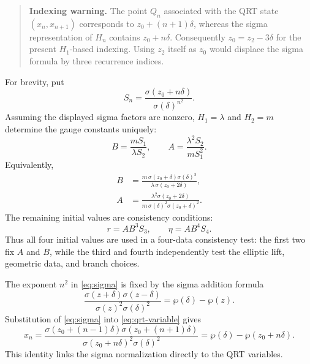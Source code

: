 \documentclass[11pt]{article}
\begin{document}
\begin{quote}
\textbf{Indexing warning.} The point $Q_n$ associated with the QRT state
$(x_n,x_{n+1})$ corresponds to $z_0+(n+1)\delta$, whereas the sigma
representation of $H_n$ contains $z_0+n\delta$. Consequently
$z_0=z_2-3\delta$ for the present $H_1$-based indexing. Using $z_2$ itself as
$z_0$ would displace the sigma formula by three recurrence indices.
\end{quote}

For brevity, put
\begin{equation}
  S_n=\frac{\sigma(z_0+n\delta)}{\sigma(\delta)^{n^2}}.
  \label{eq:Sn}
\end{equation}
Assuming the displayed sigma factors are nonzero, $H_1=\lambda$ and $H_2=m$
determine the gauge constants uniquely:
\begin{equation}
  B=\frac{mS_1}{\lambda S_2},
  \qquad
  A=\frac{\lambda^2S_2}{mS_1^2}.
  \label{eq:AB-from-S}
\end{equation}
Equivalently,
\begin{align}
  B&=\frac{m\,\sigma(z_0+\delta)\sigma(\delta)^3}
          {\lambda\,\sigma(z_0+2\delta)},
  \label{eq:B-explicit}\\
  A&=\frac{\lambda^2\sigma(z_0+2\delta)}
          {m\,\sigma(\delta)^2\sigma(z_0+\delta)^2}.
  \label{eq:A-explicit}
\end{align}
The remaining initial values are consistency conditions:
\begin{equation}
  r=A B^3S_3,
  \qquad
  \eta=A B^4S_4.
  \label{eq:sigma-initial-checks}
\end{equation}
Thus all four initial values are used in a four-data consistency test: the
first two fix $A$ and $B$, while the third and fourth independently test the
elliptic lift, geometric data, and branch choices.

The exponent $n^2$ in \cref{eq:sigma} is fixed by the sigma addition formula
\begin{equation}
  \frac{\sigma(z+\delta)\sigma(z-\delta)}
       {\sigma(z)^2\sigma(\delta)^2}
  =\wp(\delta)-\wp(z).
  \label{eq:sigma-addition}
\end{equation}
Substitution of \cref{eq:sigma} into \cref{eq:qrt-variable} gives
\begin{equation}
  x_n=
  \frac{\sigma(z_0+(n-1)\delta)\sigma(z_0+(n+1)\delta)}
       {\sigma(z_0+n\delta)^2\sigma(\delta)^2}
  =\wp(\delta)-\wp(z_0+n\delta).
  \label{eq:xn-sigma}
\end{equation}
This identity links the sigma normalization directly to the QRT variables.
\end{document}
